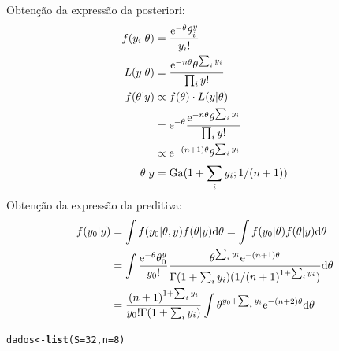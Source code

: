 \documentclass[11pt,a4]{article}\usepackage[]{graphicx}\usepackage[]{xcolor}
\makeatletter
\newcommand{\hlnum}[1]{\textcolor[rgb]{0.686,0.059,0.569}{#1}}%
\newcommand{\hldef}[1]{\textcolor[rgb]{0.345,0.345,0.345}{#1}}%
\newcommand{\hlkwb}[1]{\textcolor[rgb]{0.69,0.353,0.396}{#1}}%
\newcommand{\hlkwc}[1]{\textcolor[rgb]{0.333,0.667,0.333}{#1}}%
\newcommand{\hlkwd}[1]{\textcolor[rgb]{0.737,0.353,0.396}{\textbf{#1}}}%
\newenvironment{kframe}{%
 \def\at@end@of@kframe{}%
 \ifinner\ifhmode%
  \def\at@end@of@kframe{\end{minipage}}%
  \begin{minipage}{\columnwidth}%
 \fi\fi%
 \def\FrameCommand##1{\hskip\@totalleftmargin \hskip-\fboxsep
 \colorbox{shadecolor}{##1}\hskip-\fboxsep
     \hskip-\linewidth \hskip-\@totalleftmargin \hskip\columnwidth}%
 \MakeFramed {\advance\hsize-\width
   \@totalleftmargin\z@ \linewidth\hsize
   \@setminipage}}%
 {\par\unskip\endMakeFramed%
 \at@end@of@kframe}
\newenvironment{knitrout}{}{} %
\makeatother
\begin{document}
\begin{enumerate}
\begin{solucao}
  Obtenção da expressão da posteriori:
  \begin{align*} 
    f(y_i|\theta) &= \frac{{\rm e}^{-\theta}\theta^y_i}{y_i!} \\
    L(y|\theta) &= \frac{{\rm e}^{-n \theta}\theta^{\sum_i y_i}}{\prod_i y!} \\    
    f(\theta|y) &\propto f(\theta)  \cdot L(y|\theta) \\
                 &= {\rm e}^{-\theta} \frac{{\rm e}^{-n \theta}\theta^{\sum_i y_i}}{\prod_i y!} \\   
                 &\propto {\rm e}^{-(n+1) \theta} \theta^{\sum_i y_i}\\
              \theta|y &= {\rm Ga}(1+\sum_i y_i ; 1/(n+1))   
  \end{align*}
  Obtenção da expressão da preditiva:
  \begin{align*} 
  f(y_0|y) &= \int f(y_0|\theta, y) f(\theta|y) {\rm d}\theta = \int f(y_0|\theta) f(\theta|y) {\rm d}\theta \\
  &= \int \frac{{\rm e}^{-\theta}\theta^y_0}{y_0!} \frac{\theta^{\sum_i y_i} {\rm e}^{-(n+1)\theta}}{\Gamma(1 + \sum_i y_i) (1/(n+1)^{1 + \sum_i y_i})} {\rm d}\theta \\
  &= \frac{(n+1)^{1 + \sum_i y_i}}{y_0! \Gamma(1 + \sum_i y_i)} \int \theta^{y_0 + \sum_i y_i} {\rm e}^{-(n+2)\theta} {\rm d}\theta 
  \end{align*}
  
\begin{knitrout}
\color{fgcolor}\begin{kframe}
\begin{alltt}
\hldef{dados} \hlkwb{<-} \hlkwd{list}\hldef{(}\hlkwc{S}\hldef{=}\hlnum{32}\hldef{,} \hlkwc{n}\hldef{=}\hlnum{8}\hldef{)}


\end{alltt}
\end{kframe}
\end{knitrout}
\end{solucao}
\end{enumerate}
\end{document}
